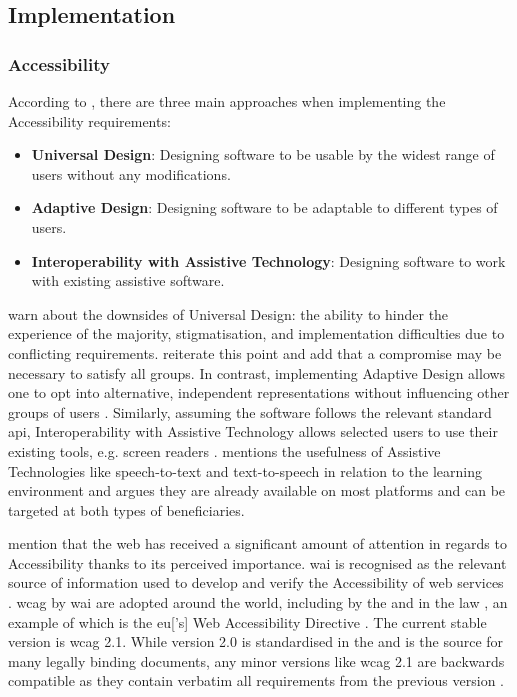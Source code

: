 \subsection{Implementation}
\label{Literature-HSIE-Implementation}

\subsubsection{Accessibility}

According to \textcite[p. 296]{Wegge_Zimmermann_2007}, there are three main approaches when implementing the Accessibility requirements:

\begin{itemize}
    \item \textbf{Universal Design}: Designing software to be usable by the widest range of users without any modifications.
    \item \textbf{Adaptive Design}: Designing software to be adaptable to different types of users.
    \item \textbf{Interoperability with Assistive Technology}: Designing software to work with existing assistive software.
\end{itemize}

\textcite{Wegge_Zimmermann_2007} warn about the downsides of Universal Design: the ability to hinder the experience of the majority, stigmatisation, and implementation difficulties due to conflicting requirements.
\textcite{Juergen_et_all_2020} reiterate this point and add that a compromise may be necessary to satisfy all groups.
In contrast, implementing Adaptive Design allows one to opt into alternative, independent representations without influencing other groups of users \parencite{Wegge_Zimmermann_2007}.
Similarly, assuming the software follows the relevant standard \gls{api}, Interoperability with Assistive Technology allows selected users to use their existing tools, e.g. screen readers \parencite{Wegge_Zimmermann_2007}.
\textcite{Edyburn_2021} mentions the usefulness of Assistive Technologies like speech-to-text and text-to-speech in relation to the learning environment and argues they are already available on most platforms and can be targeted at both types of beneficiaries.

\textcite{Juergen_et_all_2020} mention that the web has received a significant amount of attention in regards to Accessibility thanks to its perceived importance.
\gls{wai} is recognised as the relevant source of information used to develop and verify the Accessibility of web services \parencite{WAI_Intro}.
\gls{wcag} by \gls{wai} are adopted around the world, including by the \textcite{ISO_40500:2012} and in the law \parencite{WAI_Policies}, an example of which is the \gls{eu}['s] Web Accessibility Directive \parencite{EU_Web_Accessibility}.
The current stable version is \gls{wcag} 2.1. While version 2.0 is standardised in the \textcite{ISO_40500:2012} and is the source for many legally binding documents, any minor versions like \gls{wcag} 2.1 are backwards compatible as they contain verbatim all requirements from the previous version \parencite{WAI_WCAG}.

